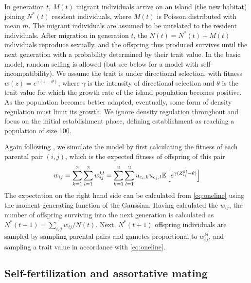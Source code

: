 \documentclass[12pt,a4paper]{article}
\begin{document}
In generation $t$, $M(t)$ migrant individuals arrive on an island (the new
habitat) joining $N^\ast(t)$ resident individuals, where $M(t)$ is Poisson
distributed with mean $m$. 
The migrant individuals are assumed to be unrelated to the resident
individuals.
After migration in generation $t$, the $N(t) = N^\ast(t) + M(t)$ individuals
reproduce sexually, and the offspring thus produced survives until the next
generation with a probability determined by their trait value.
In the basic model, random selfing is allowed (but see below for a model with
self-incompatibility).
We assume the trait is under directional selection, with fitness $w(z) =
e^{\gamma(z - \theta)}$, where $\gamma$ is the intensity of directional
selection and $\theta$ is the trait value for which the growth rate of the
island population becomes positive.
As the population becomes better adapted, eventually, some form of density
regulation must limit its growth.
We ignore density regulation throughout and focus on the initial establishment
phase, defining establishment as reaching a population of size 100.

Again following \cite{barton2018}, we simulate the model by first calculating
the fitness of each parental pair $(i,j)$, which is the expected fitness of
offspring of this pair
\begin{equation}
  w_{ij}
    = \sum_{k=1}^2\sum_{l=1}^2 w_{ij}^{kl}
    = \sum_{k=1}^2\sum_{l=1}^2 u_{c_{i},k}u_{c_{j},l}
        \mathbb{E}\left[e^{\gamma(Z_{ij}^{kl} - \theta)}\right]
\end{equation}
The expectation on the right hand side can be calculated from \cref{eq:oneline}
using the moment-generating function of the Gaussian.
Having calculated the $w_{ij}$, the number of offspring surviving into the next
generation is calculated as $N^\ast(t+1) = \sum_{i,j}w_{ij}/N(t)$.
Next, $N^\ast(t+1)$ offspring individuals are sampled by sampling parental
pairs and gametes proportional to $w_{ij}^{kl}$, and sampling a trait value
in accordance with \cref{eq:oneline}. 


\subsection*{Self-fertilization and assortative mating}
\end{document}
